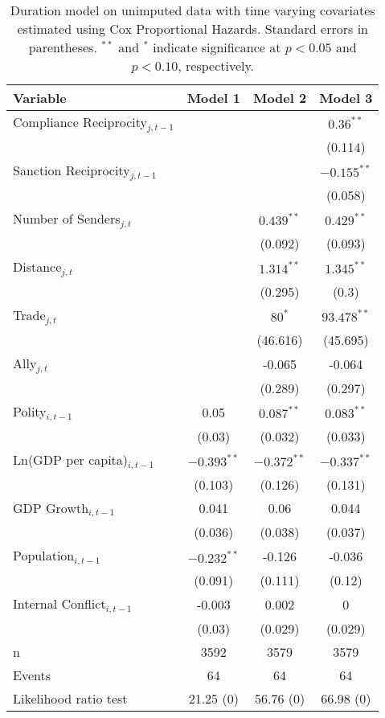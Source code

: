 \begin{table}[ht]
\centering
{\normalsize
\begin{tabular}{lccc}
 Variable & Model 1 & Model 2 & Model 3 \\ 
  \hline
\hline
Compliance Reciprocity$_{j,t-1}$ &  &  & $0.36^{\ast\ast}$ \\ 
   &  &  & (0.114) \\ 
  Sanction Reciprocity$_{j,t-1}$ &  &  & $-0.155^{\ast\ast}$ \\ 
   &  &  & (0.058) \\ 
   \hline
Number of Senders$_{j,t}$ &  & $0.439^{\ast\ast}$ & $0.429^{\ast\ast}$ \\ 
   &  & (0.092) & (0.093) \\ 
  Distance$_{j,t}$ &  & $1.314^{\ast\ast}$ & $1.345^{\ast\ast}$ \\ 
   &  & (0.295) & (0.3) \\ 
  Trade$_{j,t}$ &  & $80^{\ast}$ & $93.478^{\ast\ast}$ \\ 
   &  & (46.616) & (45.695) \\ 
  Ally$_{j,t}$ &  & -0.065 & -0.064 \\ 
   &  & (0.289) & (0.297) \\ 
   \hline
Polity$_{i,t-1}$ & 0.05 & $0.087^{\ast\ast}$ & $0.083^{\ast\ast}$ \\ 
   & (0.03) & (0.032) & (0.033) \\ 
  Ln(GDP per capita)$_{i,t-1}$ & $-0.393^{\ast\ast}$ & $-0.372^{\ast\ast}$ & $-0.337^{\ast\ast}$ \\ 
   & (0.103) & (0.126) & (0.131) \\ 
  GDP Growth$_{i,t-1}$ & 0.041 & 0.06 & 0.044 \\ 
   & (0.036) & (0.038) & (0.037) \\ 
  Population$_{i,t-1}$ & $-0.232^{\ast\ast}$ & -0.126 & -0.036 \\ 
   & (0.091) & (0.111) & (0.12) \\ 
  Internal Conflict$_{i,t-1}$ & -0.003 & 0.002 & 0 \\ 
   & (0.03) & (0.029) & (0.029) \\ 
   \hline
n & 3592 & 3579 & 3579 \\ 
  Events & 64 & 64 & 64 \\ 
  Likelihood ratio test & 21.25 (0) & 56.76 (0) & 66.98 (0) \\ 
   \hline
\hline
\end{tabular}
}
\caption{Duration model on unimputed data with time varying covariates estimated using Cox Proportional Hazards. Standard errors in parentheses. $^{**}$ and $^{*}$ indicate significance at $p< 0.05 $ and $p< 0.10 $, respectively.} 
\label{tab:regResultsNoImp}
\end{table}

